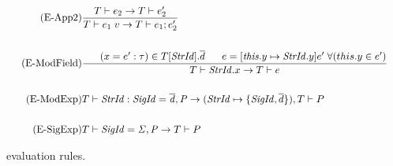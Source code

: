 \begin{figure}[htb]
\begin{align*}
\\
\tag{E-App2}
&\frac{T \vdash e_{2} \rightarrow T \vdash e_{2}'}
{T \vdash e_{1}\;v \rightarrow T \vdash e_{1};e_{2}'}
\\
\\
\tag{E-ModField}
&\frac{\;\;\;\;\;\; (x=e':\tau) \in T[\mathit{StrId}].\overline{d} \;\;\;\;\;\; e=[\mathit{this}.y\mapsto \mathit{StrId}.y]e'\;\forall (this.y \in e')}
{T \vdash \mathit{StrId}.x \rightarrow T \vdash e}\\
\\
\tag{E-ModExp}
&T \vdash \mathit{StrId:SigId = \overline{d},P} \rightarrow (\mathit{StrId} \mapsto \lbrace \mathit{SigId},\overline{d}\rbrace), T \vdash P \\
\\
\tag{E-SigExp}
&T \vdash \mathit{SigId = \Sigma, P} \rightarrow T \vdash P
\end{align*}
\caption{\MiniML\ evaluation rules.\label{fig:MiniMLOperationalSemantics}}
\end{figure}
